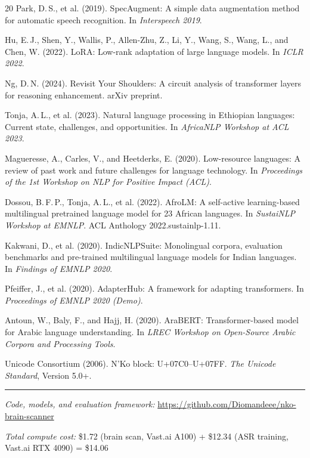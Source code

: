 \documentclass[11pt]{article}
\begin{document}
\begin{thebibliography}{20}
Park, D.\,S., et al. (2019).
SpecAugment: A simple data augmentation method for automatic speech recognition.
In \emph{Interspeech 2019}.

Hu, E.\,J., Shen, Y., Wallis, P., Allen-Zhu, Z., Li, Y., Wang, S., Wang, L., and Chen, W. (2022).
LoRA: Low-rank adaptation of large language models.
In \emph{ICLR 2022}.

Ng, D.\,N. (2024).
Revisit Your Shoulders: A circuit analysis of transformer layers for reasoning enhancement.
arXiv preprint.

Tonja, A.\,L., et al. (2023).
Natural language processing in Ethiopian languages: Current state, challenges, and opportunities.
In \emph{AfricaNLP Workshop at ACL 2023}.

Magueresse, A., Carles, V., and Heetderks, E. (2020).
Low-resource languages: A review of past work and future challenges for language technology.
In \emph{Proceedings of the 1st Workshop on NLP for Positive Impact (ACL)}.

Dossou, B.\,F.\,P., Tonja, A.\,L., et al. (2022).
AfroLM: A self-active learning-based multilingual pretrained language model for 23 African languages.
In \emph{SustaiNLP Workshop at EMNLP}. ACL Anthology 2022.sustainlp-1.11.

Kakwani, D., et al. (2020).
IndicNLPSuite: Monolingual corpora, evaluation benchmarks and pre-trained multilingual language models for Indian languages.
In \emph{Findings of EMNLP 2020}.

Pfeiffer, J., et al. (2020).
AdapterHub: A framework for adapting transformers.
In \emph{Proceedings of EMNLP 2020 (Demo)}.

Antoun, W., Baly, F., and Hajj, H. (2020).
AraBERT: Transformer-based model for Arabic language understanding.
In \emph{LREC Workshop on Open-Source Arabic Corpora and Processing Tools}.

Unicode Consortium (2006).
N'Ko block: U+07C0--U+07FF.
\emph{The Unicode Standard}, Version 5.0+.

\end{thebibliography}

\vspace{2em}
\noindent\rule{\textwidth}{0.4pt}

\vspace{0.5em}
\noindent\small\textit{Code, models, and evaluation framework:} \url{https://github.com/Diomandeee/nko-brain-scanner}

\noindent\small\textit{Total compute cost:} \$1.72 (brain scan, Vast.ai A100) + \$12.34 (ASR training, Vast.ai RTX 4090) = \$14.06
\end{document}
